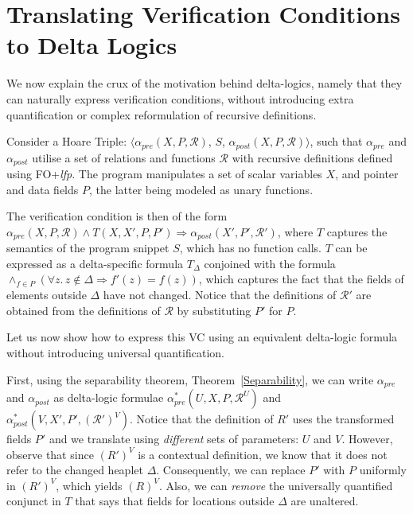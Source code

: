 	\section{Translating Verification Conditions to Delta Logics}
\label{sec:VC2Delta}	
	We now explain the crux of the motivation behind delta-logics, namely that they can naturally express verification conditions,
	without introducing extra quantification or complex reformulation of recursive definitions.
	
Consider a Hoare Triple: $\langle \alpha_{\textit{pre}}(X, P, \mathcal{R})$, $S$, $\alpha_{\textit{post}}(X, P, \mathcal{R})\rangle$,
such that $\alpha_{pre}$ and $\alpha_{post}$ utilise a set of relations and functions $\mathcal{R}$ with recursive definitions defined using FO+\textit{lfp}. 
The program manipulates a set of scalar variables $X$, and pointer and data fields $P$, the latter being modeled as unary functions. 

The verification condition is then of the form $\alpha_{\textit{pre}}(X, P, \mathcal{R}) \land{} T(X, X', P, P') \Rightarrow 
\alpha_{\textit{post}} (X', P', \mathcal{R'})$, where $T$ captures the semantics of the program snippet $S$, which has no function calls.
$T$ can be expressed as a delta-specific formula $T_\Delta$ conjoined with the formula 
$\wedge_{f \in{} P} \left(\forall{}z.\,z\notin{}\Delta{} \Rightarrow f'(z) = f(z) \right)$, which captures
the fact that the fields of elements outside $\Delta$ have not changed. Notice that the definitions of $\mathcal{R'}$ are 
obtained from the definitions of $\mathcal{R}$ by substituting $P'$ for $P$.

Let us now show how to express this VC using an equivalent delta-logic formula without introducing universal quantification.

First, using the separability theorem, Theorem~\ref{Separability}, we can write $\alpha_{\textit{pre}}$ and $\alpha_{\textit{post}}$
as delta-logic formulae $\alpha_{\textit{pre}}^*(U, X, P, \mathcal{R}^U)$ and $\alpha_{\textit{post}}^*(V, X', P', \mathcal{(R')}^V)$.
Notice that the definition of $R'$ uses the transformed fields $P'$ and we translate using \emph{different} sets of parameters: $U$
and $V$. However, observe that since $(R')^V$ is a contextual definition, we know that it does not refer to the changed heaplet
$\Delta$. Consequently, we can replace $P'$ with $P$ uniformly in $(R')^V$, which yields $(R)^V$. Also, we can \emph{remove} the universally
quantified conjunct in $T$ that says that fields for locations outside $\Delta$ are unaltered.

